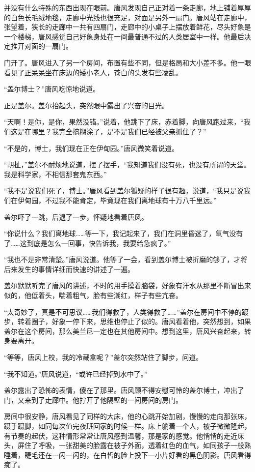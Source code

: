 并没有什么特殊的东西出现在眼前。唐风发现自己正对着一条走廊，地上铺着厚厚的白色长毛绒地毯，走廊中光线也很充足，对面是另外一扇门。唐风站在走廊中，张望着，狭长的走廊中一共有四扇门，走廊中的小桌子上摆放着鲜花，尽头好象是一个楼梯，唐风感觉自己好象身处在一间最普通不过的人类居室中一样。他最后决定推开对面的一扇门。

门开了。唐风进入了另一个房间，布置有些不同，但是格局和大小差不多。他一眼看见了正呆呆坐在床边的矮小老人，苍白的头发有些凌乱。

“盖尔博士？”唐风吃惊地说道。

正是盖尔。盖尔抬起头，突然眼中露出了兴奋的目光。

“天啊！是你，是你，果然没错。”说着，他跳下了床，赤着脚，向唐风跑过来，“我们这是在哪里？我完全搞糊涂了，是不是我们已经被父亲抓住了？”

“不是的，博士，我们现在正在伊甸园。”唐风微笑着说道。

“胡扯，”盖尔不耐烦地说道，摆了摆手，“我知道我们没有死，也没有所谓的天堂。我是科学家，不相信那套鬼东西。”

“我不是说我们死了，博士。”唐风看到盖尔狐疑的样子很有趣，说道，“我只是说我们在伊甸园，不过我不能肯定，毕竟现在我们离地球有十万八千里远。”

盖尔吓了一跳，后退了一步，怀疑地看着唐风。

“你说什么？我们离地球……等一下，我记起来了，我们在洞里昏迷了，氧气没有了……这到底是怎么一回事，快告诉我，我要给急疯了。”

“我也不是非常清楚。”唐风说道。他等了一会，看到盖尔博士被折磨的够了，才将后来发生的事情详细而快速的讲述了一遍。

盖尔默默听完了唐风的讲述，不时的用手摸着脑袋，好象有汗水从那里不断冒出来似的，他低着头，喘着粗气，脸有些潮红，样子有些亢奋。

“太奇妙了，真是不可思议……我们得救了，人类得救了……”盖尔在房间中不停的踱步，转着圈子，好象一停下来，思维也停止了似的。唐风看着他，突然想到，如果盖尔在这个房间，那么美兰尼一定也在其他房间中。想到这里，唐风兴奋起来，转身要离开。

“等等，唐风上校，我的冷藏盒呢？”盖尔突然站住了脚步，问道。

“我不知道。”唐风说道，“或许已经掉到水中了。”

盖尔露出了恐怖的表情，傻在了那里。唐风顾不得安慰可怜的盖尔博士，冲出了门，又来到了走廊中。他拧开了他隔壁的一间房间的房门。

房间中很安静，唐风看见了同样的大床，他的心跳开始加剧，慢慢的走向那张床，蹑手蹑脚，如同每次值完夜班回家的时候一样。床上躺着一个人，被子微微隆起，有节奏的起伏，这种情形常常让唐风感到温馨，那是家的感觉。他悄悄的走近床头，屏住了呼吸，一张甜美的脸露在被子外面，透着红色的血气，如同孩子一般熟睡着，睫毛还在一闪一闪的，在白皙的脸上投下一小片好看的黑色阴影。唐风看得痴了。

